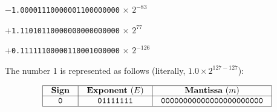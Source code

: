
$-${\tt 1.00001110000001100000000} $\times$ $2^{-83}$

\vskip 10pt

+{\tt 1.11010110000000000000000} $\times$ $2^{77}$

\vskip 10pt

+{\tt 0.11111100000110001000000} $\times$ $2^{-126}$
 
\vskip 10pt

The number 1 is represented as follows (literally, $1.0 \times 2^{127-127}$):


$$\vbox{\offinterlineskip
\halign{\strut
\vrule \quad\hfil # \ \hfil & 
\vrule \quad\hfil # \ \hfil & 
\vrule \quad\hfil # \ \hfil \vrule \cr
\noalign{\hrule}
%
{\bf Sign} & {\bf Exponent} ($E$) & {\bf Mantissa} ($m$) \cr
%
\noalign{\hrule}
%
{\tt 0} & {\tt 01111111} & {\tt 00000000000000000000000} \cr
%
\noalign{\hrule}
} %
}$$ %











